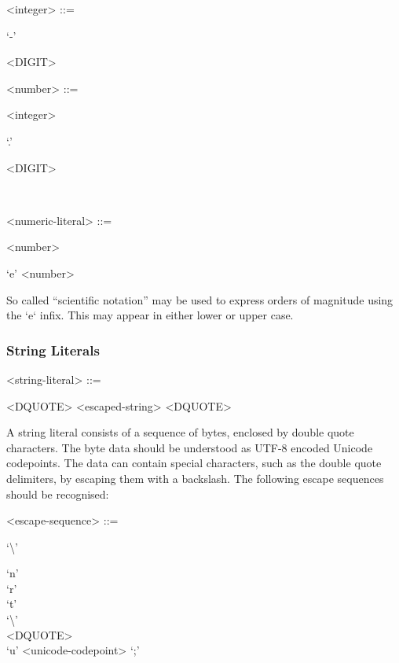 \begin{grammar}
  <integer> ::= \begin{syntdiag}
    \begin{stack}
      `-' \\
    \end{stack}
    \begin{rep}
      <DIGIT>
    \end{rep}
  \end{syntdiag}

  <number> ::= \begin{syntdiag}
    <integer>
    \begin{stack}
      `.' \begin{rep}<DIGIT>\end{rep} \\
    \end{stack}
  \end{syntdiag}

  <numeric-literal> ::= \begin{syntdiag}
    <number>
    \begin{stack}
      `e' <number> \\
    \end{stack}
  \end{syntdiag}
\end{grammar}

So called ``scientific notation'' may be used to express orders of
magnitude using the `e` infix. This may appear in either lower or upper
case.

\subsubsection{String Literals}

\begin{grammar}
  <string-literal> ::= \begin{syntdiag}
    <DQUOTE>
    <escaped-string>
    <DQUOTE>
  \end{syntdiag}
\end{grammar}

A string literal consists of a sequence of bytes, enclosed by double
quote characters. The byte data should be understood as UTF-8 encoded
Unicode codepoints. The data can contain special characters, such as the
double quote delimiters, by escaping them with a backslash. The
following escape sequences should be recognised:

\begin{grammar}
  <escape-sequence> ::= \begin{syntdiag}
    `\textbackslash'
    \begin{stack}
      `n' \\
      `r' \\
      `t' \\
      `\textbackslash' \\
      <DQUOTE> \\
      `u' <unicode-codepoint> `;'
    \end{stack}
  \end{syntdiag}
\end{grammar}

